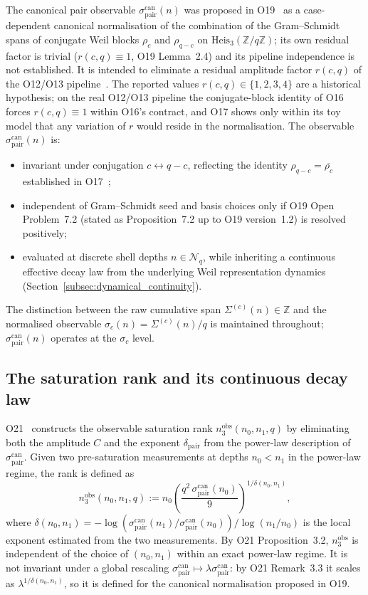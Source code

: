 \documentclass[12pt,a4paper]{article}
\theoremstyle{remark}
\newcommand{\sigpair}{\sigma^{\mathrm{can}}_{\mathrm{pair}}}
\newcommand{\nobs}{n^{\mathrm{obs}}_3}
\newcommand{\dpair}{\delta_{\mathrm{pair}}}
\newcommand{\Heis}{\mathrm{Heis}_3(\mathbb{Z}/q\mathbb{Z})}
\begin{document}
    The canonical pair observable $\sigpair(n)$ was proposed in O19~\cite{Beau2026a23}
    as a case-dependent canonical normalisation of the combination of the Gram--Schmidt spans
    of conjugate Weil blocks $\rho_c$ and $\rho_{q-c}$ on $\Heis$; its own residual factor is
    trivial ($r(c,q)\equiv1$, O19 Lemma~2.4) and its pipeline independence is not established.
    It is intended to eliminate a residual amplitude factor $r(c,q)$ of the O12/O13
    pipeline~\cite{Beau2026a16,Beau2026a17}.
    The reported values $r(c,q) \in \{1,2,3,4\}$ are a historical hypothesis; on the real
    O12/O13 pipeline the conjugate-block identity of O16~\cite{Beau2026a20} forces
    $r(c,q) \equiv 1$ within O16's contract, and O17 shows only within its toy model that any
    variation of $r$ would reside in the normalisation.
    The observable $\sigpair(n)$ is:
    \begin{itemize}
      \item invariant under conjugation $c \leftrightarrow q-c$, reflecting the identity
      $\rho_{q-c} = \overline{\rho_c}$ established in O17~\cite{Beau2026a21};
      \item independent of Gram--Schmidt seed and basis choices only if O19 Open
      Problem~7.2 (stated as Proposition~7.2 up to O19 version~1.2) is resolved positively;
      \item evaluated at discrete shell depths $n \in \mathcal{N}_q$, while inheriting a
      continuous effective decay law from the underlying Weil representation
      dynamics (Section~\ref{subsec:dynamical_continuity}).
    \end{itemize}
    The distinction between the raw cumulative span $\Sigma^{(c)}(n) \in \mathbb{Z}$
    and the normalised observable $\sigma_c(n) = \Sigma^{(c)}(n)/q$ is maintained
    throughout; $\sigpair(n)$ operates at the $\sigma_c$ level.

  \subsection{The saturation rank and its continuous decay law}
    \label{subsec:saturation_rank}

    O21~\cite{Beau2026a25} constructs the observable saturation rank
    $\nobs(n_0, n_1, q)$ by eliminating both the amplitude $C$ and the exponent $\dpair$
    from the power-law description of $\sigpair$.
    Given two pre-saturation measurements at depths $n_0 < n_1$ in the power-law regime,
    the rank is defined as
    \begin{equation}
      \label{eq:nobs_def}
      \nobs(n_0, n_1, q) := n_0 \left(\frac{q^2\,\sigpair(n_0)}{9}\right)^{1/\delta(n_0,n_1)},
    \end{equation}
    where $\delta(n_0, n_1) = -\log(\sigpair(n_1)/\sigpair(n_0))/\log(n_1/n_0)$ is the
    local exponent estimated from the two measurements.
    By O21 Proposition~3.2, $\nobs$ is independent of the choice of $(n_0, n_1)$ within
    an exact power-law regime.
    It is not invariant under a global rescaling $\sigpair \mapsto \lambda\sigpair$: by O21
    Remark~3.3 it scales as $\lambda^{1/\delta(n_0,n_1)}$, so it is defined for the canonical
    normalisation proposed in O19.
\end{document}
